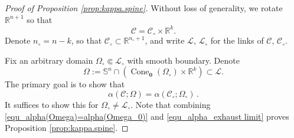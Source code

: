 \documentclass[11pt, letterpaper, reqno]{amsart}
\numberwithin{equation}{section}
\theoremstyle{remark}
\newcommand{\RR}{\mathbb{R}}
\newcommand{\SSp}{\mathbb{S}}
\newcommand{\cC}{\mathcal{C}}
\newcommand{\cL}{\mathcal{L}}
\newcommand{\orig}{\mathbf{0}}
\begin{document}
\begin{proof}[Proof of Proposition \ref{prop:kappa.spine}]
	Without loss of generality, we rotate $\RR^{n+1}$ so that
	\[ \cC = \cC_\circ \times \RR^k. \]
	Denote $n_\circ = n - k$, so that $\cC_\circ \subset \RR^{n_\circ + 1}$, and write $\cL$, $\cL_\circ$ for the links of $\cC$, $\cC_\circ$. 
	
    Fix an arbitrary domain $\Omega_\circ \Subset  \cL_\circ$ with smooth boundary. Denote
    \[ \Omega:= \SSp^n\cap (\operatorname{Cone}_\orig(\Omega_\circ)\times\RR^k)\subset \cL. \]
    The primary goal is to show that 
    \begin{equation} \label{equ_alpha(Omega)=alpha(Omega_0)}
      \alpha(\cC; \Omega) = \alpha(\cC_\circ; \Omega_\circ)\,. 
    \end{equation}
    It suffices to show this for $\Omega_\circ \neq \cL_\circ$.
    Note that combining \eqref{equ_alpha(Omega)=alpha(Omega_0)} and \eqref{equ_alpha_exhaust limit} proves Proposition \ref{prop:kappa.spine}. 


\end{proof}
\end{document}
